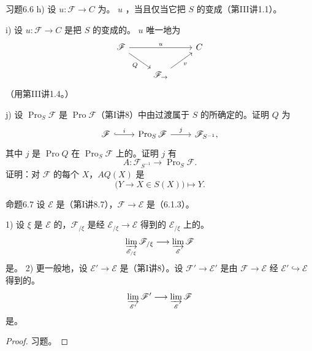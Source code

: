 \begin{SGAresult}{习题}{6.6}
h) 设 $u:\mathscr F\to C$ 为。 $u$ ，当且仅当它把 $S$ 的变成（第III讲1.1）。

i) 设 $u:\mathscr F\to C$ 是把 $S$ 的变成的。 $u$ 唯一地为
\[
\begin{tikzcd}
\mathscr F\arrow[rr,"u"]\arrow[dr,"Q"']&&C\\
&\mathscr F_{\to}\arrow[ur,"v"']&
\end{tikzcd}
\]
（用第III讲1.4。）

j) 设 $\operatorname{Pro}_S\mathscr F$ 是 $\operatorname{Pro}\mathscr F$（第I讲8）中由过渡属于 $S$ 的所确定的。证明 $Q$ 为
\[
\begin{tikzcd}
\mathscr F\arrow[r,hook,"i"]&\operatorname{Pro}_S\mathscr F\arrow[r,"j"]&\mathscr F_{S^{-1}},
\end{tikzcd}
\]
其中 $j$ 是 $\operatorname{Pro}Q$ 在 $\operatorname{Pro}_S\mathscr F$ 上的。证明 $j$ 有
\[
A:\mathscr F_{S^{-1}}\longrightarrow\operatorname{Pro}_S\mathscr F.
\]
证明：对 $\mathscr F$ 的每个 $X$，$AQ(X)$ 是
\[
\bigl(Y\longrightarrow X\in S(X)\bigr)\longmapsto Y.
\]
\end{SGAresult}

\begin{SGAresult}{命题}{6.7}
设 $\mathscr E$ 是（第I讲8.7），$\mathscr F\to\mathscr E$ 是（6.1.3）。

1) 设 $\xi$ 是 $\mathscr E$ 的，$\mathscr F_{/\xi}$ 是经 $\mathscr E_{/\xi}\to\mathscr E$ 得到的 $\mathscr E_{/\xi}$ 上的。
\[
\varinjlim_{\mathscr E_{/\xi}}\mathscr F_{/\xi}\longrightarrow\varinjlim_{\mathscr E}\mathscr F
\]
是。
2) 更一般地，设 $\mathscr E'\to\mathscr E$ 是（第I讲8）。设 $\mathscr F'\to\mathscr E'$ 是由 $\mathscr F\to\mathscr E$ 经 $\mathscr E'\hookrightarrow\mathscr E$ 得到的。
\[
\varinjlim_{\mathscr E'}\mathscr F'\longrightarrow\varinjlim_{\mathscr E}\mathscr F
\]
是。
\end{SGAresult}
\begin{proof}
习题。
\end{proof}

